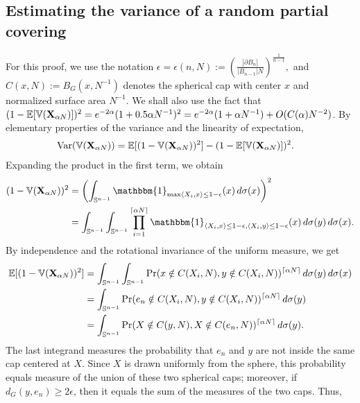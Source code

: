 	\subsection{Estimating the variance of a random partial covering}
	For this proof, we use the notation
	$
	    \epsilon=\epsilon(n,N) := \left(\frac{|\partial B_{n}|}{|B_{n-1}|N}\right)^{\frac{1}{n-1}},
	$
	and 
	$
	    C(x,N):= B_G(x,N^{-1})
	$
	denotes the spherical cap with center $x$ and normalized surface area $N^{-1}$. 
	We shall also use the fact that $  (1-{\mathbb{E}}[\mathbb{V}(\mathbf{X}_{\alpha N})])^2 = e^{-2\alpha}(1+0.5 \alpha N^{-1})^2 =  e^{-2\alpha}(1+\alpha N^{-1}) + O(C(\alpha)N^{-2}) $. 
	By elementary properties of the variance and the linearity of expectation,
	\begin{align}\label{variancecaps}
	    \var(\mathbb{V}(\mathbf{X}_{\alpha N})) %
	    &=\E[(1-\mathbb{V}(\mathbf{X}_{\alpha N}))^2]-(1-\E[\mathbb{V}(\mathbf{X}_{\alpha N})])^2.
	\end{align}
Expanding the product in the first term, we obtain
	\begin{align*}
	    (1-\mathbb{V}(\mathbf{X}_{\alpha N}))^2 &= \left(\int_{\Sn}\mathbbm{1}_{\max\langle X_{i},x\rangle\leq 1-\epsilon}(x)\,d\sigma(x)\right)^2
	    \\&=
	    \int_{\Sn}\int_{\Sn}\prod_{i=1}^{\lceil\alpha N\rceil}\mathbbm{1}_{\langle X_{i},x\rangle\leq 1-\epsilon,\langle X_{i},y\rangle\leq 1-\epsilon}(x)\,d\sigma(y)\,d\sigma(x).
	\end{align*}
By independence and the rotational invariance of the uniform measure, we get
	\begin{align*}
	    {\mathbb{E}}[ (1-\mathbb{V}(\mathbf{X}_{\alpha N}))^2] &= \int_{\mathbb{S}^{n-1}}\int_{\mathbb{S}^{n-1}}\Pr( x \notin C(X_i,N),y \notin C(X_i,N))^{\lceil\alpha N\rceil}\,d\sigma(y)\,d\sigma(x) 
	    \\&= \int_{\mathbb{S}^{n-1}}\Pr( e_n \notin C(X_i,N),y \notin C(X_i,N))^{\lceil\alpha N\rceil}\,d\sigma(y)
	    \\&= \int_{\mathbb{S}^{n-1}}\Pr( X \notin C(y,N), X \notin C(e_n,N))^{\lceil\alpha N\rceil}\,d\sigma(y).
   \end{align*}
The last integrand measures the probability that $e_n$ and $y$ are not inside the same cap centered at $X$. Since $X$ is drawn uniformly from the sphere, this probability equals measure of the union of these two spherical caps; moreover, if $d_G(y,e_n) \geq 2\epsilon$, then it equals the sum of the measures of the two caps. Thus,
